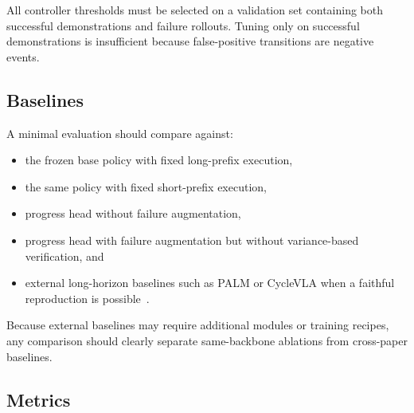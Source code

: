 \documentclass[10pt]{article}
\begin{document}
All controller thresholds must be selected on a validation set containing both
successful demonstrations and failure rollouts.
Tuning only on successful demonstrations is insufficient because false-positive
transitions are negative events.

\subsection{Baselines}

A minimal evaluation should compare against:
\begin{itemize}[leftmargin=1.5em, itemsep=0.15em]
  \item the frozen base policy with fixed long-prefix execution,
  \item the same policy with fixed short-prefix execution,
  \item progress head without failure augmentation,
  \item progress head with failure augmentation but without variance-based
  verification, and
  \item external long-horizon baselines such as PALM or CycleVLA when a faithful
  reproduction is possible~\cite{palm,cyclevla}.
\end{itemize}
Because external baselines may require additional modules or training recipes,
any comparison should clearly separate same-backbone ablations from cross-paper
baselines.

\subsection{Metrics}
\end{document}
